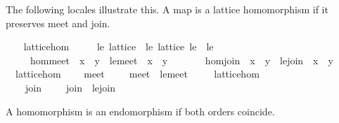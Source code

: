 \begin{isabellebody}
\begin{isamarkuptext}
  The following locales illustrate this.  A map \isa{{\isasymphi}} is a
  lattice homomorphism if it preserves meet and join.%
\end{isamarkuptext}%
\isamarkuptrue%
\ \ \isamarkupfalse%
\ lattice{\isacharunderscore}hom\ {\isacharequal}\isanewline
\ \ \ \ le{\isacharcolon}\ lattice\ {\isacharplus}\ le{\isacharprime}{\isacharcolon}\ lattice\ le{\isacharprime}\ \ le{\isacharprime}\ {\isacharparenleft}\ {\isachardoublequoteopen}{\isasympreceq}{\isachardoublequoteclose}\ {}{}{\isacharparenright}\ {\isacharplus}\isanewline
\ \ \ \ \ {\isasymphi}\isanewline
\ \ \ \ \ hom{\isacharunderscore}meet{\isacharcolon}\ {\isachardoublequoteopen}{\isasymphi}\ {\isacharparenleft}x\ {\isasymsqinter}\ y{\isacharparenright}\ {\isacharequal}\ le{\isacharprime}{\isachardot}meet\ {\isacharparenleft}{\isasymphi}\ x{\isacharparenright}\ {\isacharparenleft}{\isasymphi}\ y{\isacharparenright}{\isachardoublequoteclose}\isanewline
\ \ \ \ \ \ \ hom{\isacharunderscore}join{\isacharcolon}\ {\isachardoublequoteopen}{\isasymphi}\ {\isacharparenleft}x\ {\isasymsqunion}\ y{\isacharparenright}\ {\isacharequal}\ le{\isacharprime}{\isachardot}join\ {\isacharparenleft}{\isasymphi}\ x{\isacharparenright}\ {\isacharparenleft}{\isasymphi}\ y{\isacharparenright}{\isachardoublequoteclose}\isanewline
\isanewline
\ \ \isamarkupfalse%
\ {\isacharparenleft}\ lattice{\isacharunderscore}hom{\isacharparenright}\isanewline
\ \ \ \ meet{\isacharprime}\ {\isacharparenleft}\ {\isachardoublequoteopen}{\isasymsqinter}{\isacharprime}{\isacharprime}{\isachardoublequoteclose}\ {}{}{\isacharparenright}\ \ {\isachardoublequoteopen}meet{\isacharprime}\ {\isasymequiv}\ le{\isacharprime}{\isachardot}meet{\isachardoublequoteclose}\isanewline
\ \ \isamarkupfalse%
\ {\isacharparenleft}\ lattice{\isacharunderscore}hom{\isacharparenright}\isanewline
\ \ \ \ join{\isacharprime}\ {\isacharparenleft}\ {\isachardoublequoteopen}{\isasymsqunion}{\isacharprime}{\isacharprime}{\isachardoublequoteclose}\ {}{}{\isacharparenright}\ \ {\isachardoublequoteopen}join{\isacharprime}\ {\isasymequiv}\ le{\isacharprime}{\isachardot}join{\isachardoublequoteclose}%
\begin{isamarkuptext}%
A homomorphism is an endomorphism if both orders coincide.%

\end{isamarkuptext}
\end{isabellebody}
